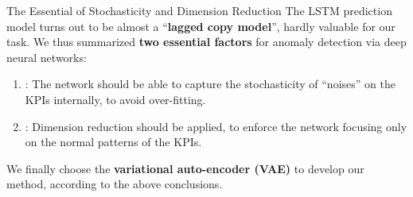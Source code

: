\documentclass[usenames,dvipsnames]{beamer}
\newcommand{\emphasis}[1]{\textbf{\textcolor{emphcolor}{#1}}}
\begin{document}
\begin{frame}{The Essential of Stochasticity and Dimension Reduction}
  The LSTM prediction model turns out to be almost a ``\emphasis{lagged copy model}'', hardly valuable for our task.  We thus summarized \emphasis{two essential factors} for anomaly detection via deep neural networks:
  \begin{enumerate}\setlength\itemsep{0em}
    \item {}: The network should be able to capture the stochasticity of ``noises'' on the KPIs internally, to avoid over-fitting.
    \item {}: Dimension reduction should be applied, to enforce the network focusing only on the normal patterns of the KPIs.
  \end{enumerate}
  We finally choose the \emphasis{variational auto-encoder (VAE)} to develop our method, according to the above conclusions.
\end{frame}
\end{document}
